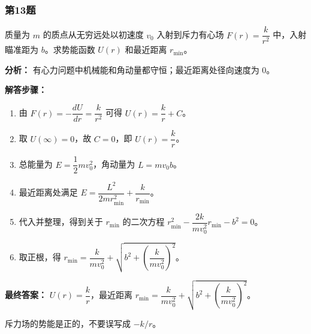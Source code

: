 \documentclass[12pt,a4paper]{ctexart}
\begin{document}
\subsubsection*{第13题}
\begin{tcolorbox}[colback=gray!2!white,colframe=black!60,title={题目}]
质量为 \(m\) 的质点从无穷远处以初速度 \(v_0\) 入射到斥力有心场 \(F(r)=\dfrac{k}{r^2}\) 中，入射瞄准距为 \(b\)。求势能函数 \(U(r)\) 和最近距离 \(r_{\min}\)。\par
\end{tcolorbox}
\begin{tcolorbox}[colback=blue!2!white,colframe=blue!55!black,title={完整答案}]
\textbf{分析：}
有心力问题中机械能和角动量都守恒；最近距离处径向速度为 0。\par
\textbf{解答步骤：}
\begin{enumerate}
\item 由 \(F(r)=-\dfrac{dU}{dr}=\dfrac{k}{r^2}\) 可得 \(U(r)=\dfrac{k}{r}+C\)。
\item 取 \(U(\infty)=0\)，故 \(C=0\)，即 \(U(r)=\dfrac{k}{r}\)。
\item 总能量为 \(E=\dfrac12 mv_0^2\)，角动量为 \(L=mv_0b\)。
\item 最近距离处满足 \(E=\dfrac{L^2}{2mr_{\min}^2}+\dfrac{k}{r_{\min}}\)。
\item 代入并整理，得到关于 \(r_{\min}\) 的二次方程 \(r_{\min}^2-\dfrac{2k}{mv_0^2}r_{\min}-b^2=0\)。
\item 取正根，得 \(r_{\min}=\dfrac{k}{mv_0^2}+\sqrt{b^2+\left(\dfrac{k}{mv_0^2}\right)^2}\)。
\end{enumerate}
\textbf{最终答案：}
\(U(r)=\dfrac{k}{r}\)，最近距离 \(r_{\min}=\dfrac{k}{mv_0^2}+\sqrt{b^2+\left(\dfrac{k}{mv_0^2}\right)^2}\)。\par
\end{tcolorbox}
\begin{tcolorbox}[colback=red!2!white,colframe=red!55!black,title={易错点}]
斥力场的势能是正的，不要误写成 \(-k/r\)。\par
\end{tcolorbox}
\end{document}
